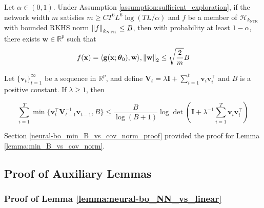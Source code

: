 \begin{auxlemma} 
\label{lemma:RKHS_expression}
Let $\alpha \in (0,1)$. Under Assumption \ref{assumption:sufficient_exploration}, if the network width $m$ satisfies  $m \geq C T^6L^6 \log(TL/\alpha)$ and $f$ be a member of $\mathcal{H}_{k_\text{NTK}}$ with bounded RKHS norm $\norm{f}_{k_\text{NTK}} \leq B$, then with probability at least $1-\alpha$, there exists $\mathbf{w} \in \mathbb{R}^p$ such that 
\[ f(\mathbf{x}) = \langle \mathbf{g}(\mathbf{x}; \boldsymbol{\theta}_0), \mathbf{w} \rangle, \norm{\mathbf{w}}_2 \leq \sqrt{\frac{2}{m}}B \]
\end{auxlemma}

\begin{auxlemma}
\label{lemma:min_B_vs_cov_norm}
Let $\{ \mathbf{v}_t\}_{t=1}^\infty$ be a sequence in $\mathbb{R}^p$, and
define $\mathbf{V}_t = \lambda \mathbf{I} + \sum^t_{i=1} \mathbf{v}_i\mathbf{v}_i^\top$ and $B$ is a positive constant. If $\lambda \geq 1$, then

\[ 
\sum_{i=1}^T \min \{ \mathbf{v}_t^\top \mathbf{V}_{t-1}^{-1}\mathbf{v}_{t-1}, B\} \leq \frac{B}{\log(B+1)} \log \det(\mathbf{I} + \lambda^{-1}\sum_{i=1}^T \mathbf{v}_i\mathbf{v}_i^\top)
\]
\end{auxlemma}
\noindent Section \ref{neural-bo_min_B_vs_cov_norm_proof} provided the proof for Lemma \ref{lemma:min_B_vs_cov_norm}. 
\subsection{Proof of Auxiliary Lemmas}
\subsubsection{Proof of Lemma \ref{lemma:neural-bo_NN_vs_linear}}
\label{NN_vs_linear_proof}


